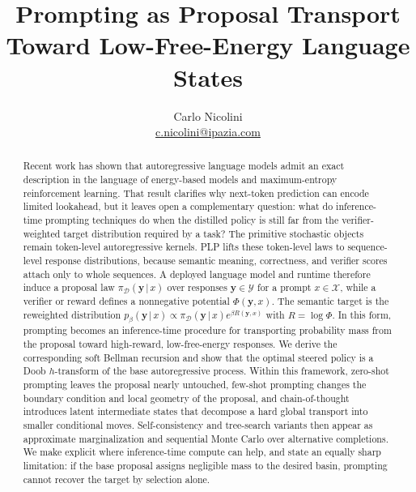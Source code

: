 \documentclass[aps,pre,reprint,superscriptaddress,nofootinbib]{revtex4-2}
\newcommand{\given}{\,|\,}
\newcommand{\cX}{\mathcal{X}}
\newcommand{\cY}{\mathcal{Y}}
\newcommand{\y}{\mathbf{y}}
\begin{document}
\title{Prompting as Proposal Transport Toward Low-Free-Energy Language States}

\author{Carlo Nicolini\\\url{c.nicolini@ipazia.com}}
\begin{abstract}
Recent work has shown that autoregressive language models admit an exact description in the language of energy-based models and maximum-entropy reinforcement learning. 
That result clarifies why next-token prediction can encode limited lookahead, but it leaves open a complementary question: what do inference-time prompting techniques do when the distilled policy is still far from the verifier-weighted target distribution required by a task? 
The primitive stochastic objects remain token-level autoregressive kernels. PLP lifts these token-level laws to sequence-level response distributions, because semantic meaning, correctness, and verifier scores attach only to whole sequences. 
A deployed language model and runtime therefore induce a proposal law $\pi_{\mathcal D}(\y \given x)$ over responses $\y \in \cY$ for a prompt $x \in \cX$, while a verifier or reward defines a nonnegative potential $\Phi(\y,x)$.
The semantic target is the reweighted distribution $p_\beta(\y \given x)\propto \pi_{\mathcal D}(\y \given x)e^{\beta R(\y,x)}$ with $R=\log \Phi$. 
In this form, prompting becomes an inference-time procedure for transporting probability mass from the proposal toward high-reward, low-free-energy responses.
We derive the corresponding soft Bellman recursion and show that the optimal steered policy is a Doob $h$-transform of the base autoregressive process. 
Within this framework, zero-shot prompting leaves the proposal nearly untouched, few-shot prompting changes the boundary condition and local geometry of the proposal, and chain-of-thought introduces latent intermediate states that decompose a hard global transport into smaller conditional moves. 
Self-consistency and tree-search variants then appear as approximate marginalization and sequential Monte Carlo over alternative completions. 
We make explicit where inference-time compute can help, and state an equally sharp limitation: if the base proposal assigns negligible mass to the desired basin, prompting cannot recover the target by selection alone.
\end{abstract}

\maketitle
\end{document}
